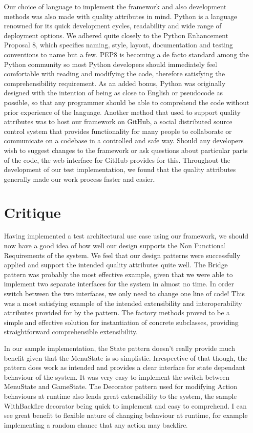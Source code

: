 \documentclass[11pt]{report}
\begin{document}
Our choice of language to implement the framework and also development methods was also made with quality attributes in mind. Python is a language renowned for its quick development cycles, readability and wide range of deployment options. We adhered quite closely to the Python Enhancement Proposal 8, which specifies naming, style, layout, documentation and testing conventions to name but a few. PEP8 is becoming a de facto standard among the Python community so most Python developers should immediately feel comfortable with reading and modifying the code, therefore satisfying the comprehensibility requirement. As an added bonus, Python was originally designed with the intention of being as close to English or pseudocode as possible, so that any programmer should be able to comprehend the code without prior experience of the language. Another method that used to support quality attributes was to host our framework on GitHub, a social distributed source control system that provides functionality for many people to collaborate or communicate on a codebase in a controlled and safe way. Should any developers wish to suggest changes to the framework or ask questions about particular parts of the code, the web interface for GitHub provides for this. Throughout the development of our test implementation, we found that the quality attributes generally made our work process faster and easier.

\section{Critique}
Having implemented a test architectural use case using our framework, we should now have a good idea of how well our design supports the Non Functional Requirements of the system. We feel that our design patterns were successfully applied and support the intended quality attributes quite well. The Bridge pattern was probably the most effective example, given that we were able to implement two separate interfaces for the system in almost no time. In order switch between the two interfaces, we only need to change one line of code! This was a most satisfying example of the intended extensibility and interoperability attributes provided for by the pattern. The factory methods proved to be a simple and effective solution for instantiation of concrete subclasses, providing straightforward comprehensible extensibility. 

In our sample implementation, the State pattern doesn’t really provide much benefit given that the MenuState is so simplistic. Irrespective of that though, the pattern does work as intended and provides a clear interface for state dependant behaviour of the system. It was very easy to implement the switch between MenuState and GameState. The Decorator pattern used for modifying Action behaviours at runtime also lends great extensibility to the system, the sample WithBackfire decorator being quick to implement and easy to comprehend. I can see great benefit to flexible nature of changing behaviour at runtime, for example implementing a random chance that any action may backfire.
\end{document}
